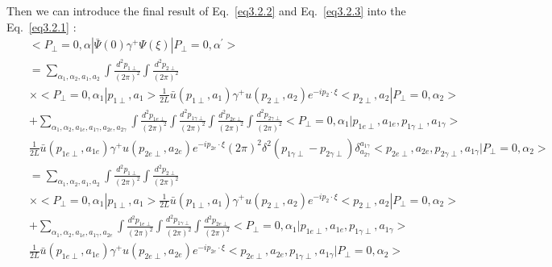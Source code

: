 \documentclass[a4paper,12pt]{article}
\begin{document}
Then we can introduce the final result of Eq.~\ref{eq3.2.2} and Eq.~\ref{eq3.2.3} into the Eq.~\ref{eq3.2.1} :
\begin{eqnarray}
  &&<P_{\perp}=0,\alpha| \bar{\Psi}(0) \gamma^+ \Psi(\xi) |P_{\perp}=0, \alpha^{\prime}>\nonumber\\ &&= \sum_{\alpha_1,\alpha_2,a_1,a_2}\int \frac{d^2 p_{1\perp}}{(2\pi)^2} \int \frac{d^2 p_{2\perp}}{(2\pi)^2}\nonumber\\&& \times <P_{\perp}=0,\alpha_1|p_{1\perp},a_1>\frac{1}{2L}\bar{u} (p_{1\perp},a_1) \gamma^+ u(p_{2\perp},a_2) e^{-ip_2 \cdot \xi}<p_{2\perp},a_2|P_{\perp}=0,\alpha_2>\nonumber\\
  &&+\sum_{\alpha_1,\alpha_2,a_{1e},a_{1\gamma},a_{2e},a_{2\gamma}} \int \frac{d^2 p_{1e\perp}}{(2\pi)^2}\int \frac{d^2 p_{1\gamma\perp}}{(2\pi)^2}\int \frac{d^2 p_{2e\perp}}{(2\pi)^2}\int \frac{d^2 p_{2\gamma\perp}}{(2\pi)^2} <P_{\perp}=0,\alpha_1|p_{1e\perp},a_{1e},p_{1\gamma\perp},a_{1\gamma}>\nonumber\\&&\frac{1}{2L}\bar{u}(p_{1e\perp},a_{1e}) \gamma^+ u(p_{2e\perp},a_{2e}) e^{-ip_{2e} \cdot \xi}(2\pi)^2 \delta^2(p_{1\gamma\perp}-p_{2\gamma\perp})\delta^{a_{1\gamma}}_{a_{2\gamma}}<p_{2e\perp},a_{2e},p_{2\gamma\perp},a_{1\gamma}|P_{\perp}=0,\alpha_2>\nonumber\\
  &&=\sum_{\alpha_1,\alpha_2,a_1,a_2}\int \frac{d^2 p_{1\perp}}{(2\pi)^2} \int \frac{d^2 p_{2\perp}}{(2\pi)^2}\nonumber\\&& \times <P_{\perp}=0,\alpha_1|p_{1\perp},a_1>\frac{1}{2L}\bar{u} (p_{1\perp},a_1) \gamma^+ u(p_{2\perp},a_2) e^{-ip_2 \cdot \xi}<p_{2\perp},a_2|P_{\perp}=0,\alpha_2>\nonumber\\
  &&+\sum_{\alpha_1,\alpha_2,a_{1e},a_{1\gamma},a_{2e}} \int \frac{d^2 p_{1e\perp}}{(2\pi)^2}\int \frac{d^2 p_{1\gamma\perp}}{(2\pi)^2}\int \frac{d^2 p_{2e\perp}}{(2\pi)^2} <P_{\perp}=0,\alpha_1|p_{1e\perp},a_{1e},p_{1\gamma\perp},a_{1\gamma}>\nonumber\\&&\frac{1}{2L}\bar{u}(p_{1e\perp},a_{1e}) \gamma^+ u(p_{2e\perp},a_{2e}) e^{-ip_{2e} \cdot \xi}<p_{2e\perp},a_{2e},p_{1\gamma\perp},a_{1\gamma}|P_{\perp}=0,\alpha_2>\nonumber\
\end{eqnarray}
\end{document}
